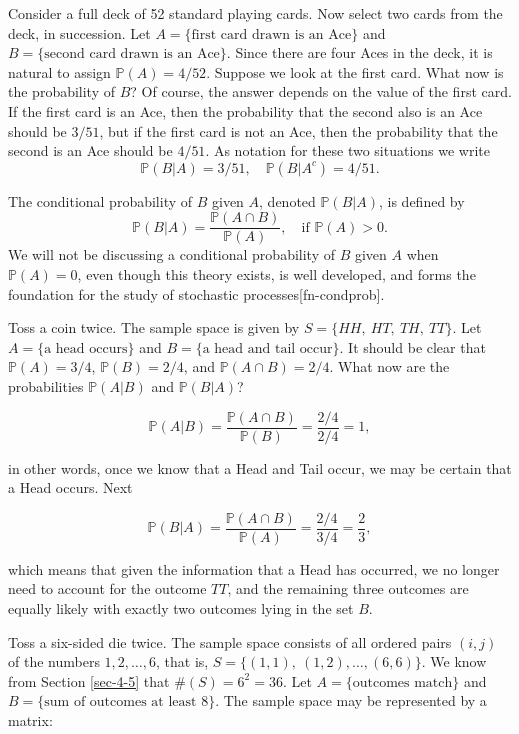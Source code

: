 Consider a full deck of 52 standard playing cards. Now select two
cards from the deck, in succession. Let \( A = \{ \mbox{first card
drawn is an Ace} \} \) and \( B = \{ \mbox{second card drawn is an
Ace} \} \). Since there are four Aces in the deck, it is natural to
assign \( \mathbb{P}(A) = 4/52 \). Suppose we look at the first
card. What now is the probability of \(B\)? Of course, the answer
depends on the value of the first card. If the first card is an Ace,
then the probability that the second also is an Ace should be \( 3/51
\), but if the first card is not an Ace, then the probability that the
second is an Ace should be \( 4/51 \). As notation for these two
situations we write 
\[ \mathbb{P}(B|A)=3/51,\quad
\mathbb{P}(B|A^{c})=4/51.  
\]

\begin{defn}
The conditional probability of \(B\) given \(A\), denoted
\(\mathbb{P}(B|A)\), is defined by
\begin{equation}
\mathbb{P}(B|A)=\frac{\mathbb{P}(A\cap B)}{\mathbb{P}(A)},\quad \mbox{if }\mathbb{P}(A)>0.
\end{equation}
We will not be discussing a conditional probability of \(B\) given
\(A\) when \(\mathbb{P}(A)=0\), even though this theory exists, is
well developed, and forms the foundation for the study of stochastic
processes[fn-condprob].
\end{defn}


Toss a coin twice. The sample space is given by \(S=\{ HH,\ HT,\ TH,\
TT \} \). Let \(A= \{ \mbox{a head occurs} \} \) and \(B= \{ \mbox{a
head and tail occur} \} \). It should be clear that
\(\mathbb{P}(A)=3/4\), \(\mathbb{P}(B)=2/4\), and \(\mathbb{P}(A\cap
B)=2/4\). What now are the probabilities \(\mathbb{P}(A|B)\) and
\(\mathbb{P}(B|A)\)?  

\[ \mathbb{P}(A|B)=\frac{\mathbb{P}(A\cap
B)}{\mathbb{P}(B)}=\frac{2/4}{2/4}=1, \] 

in other words, once we know that a Head and Tail occur, we may be
certain that a Head occurs. Next

\[ 
\mathbb{P}(B|A)=\frac{\mathbb{P}(A\cap
B)}{\mathbb{P}(A)}=\frac{2/4}{3/4}=\frac{2}{3}, 
\] 

which means that given the information that a Head has occurred, we no
longer need to account for the outcome \(TT\), and the remaining three
outcomes are equally likely with exactly two outcomes lying in the set
\(B\).



\label{exa-Toss-a-six-sided-die-twice} Toss a six-sided die twice. The
sample space consists of all ordered pairs \((i,j)\) of the numbers
\(1,2,\ldots,6\), that is, \( S = \{ (1,1),\ (1,2),\ldots,(6,6) \}
\). We know from Section \ref{sec-4-5} that \( \# (S) =
6^{2} = 36 \). Let \( A = \{ \mbox{outcomes match} \} \) and \( B = \{
\mbox{sum of outcomes at least 8} \} \). The sample space may be
represented by a matrix:

